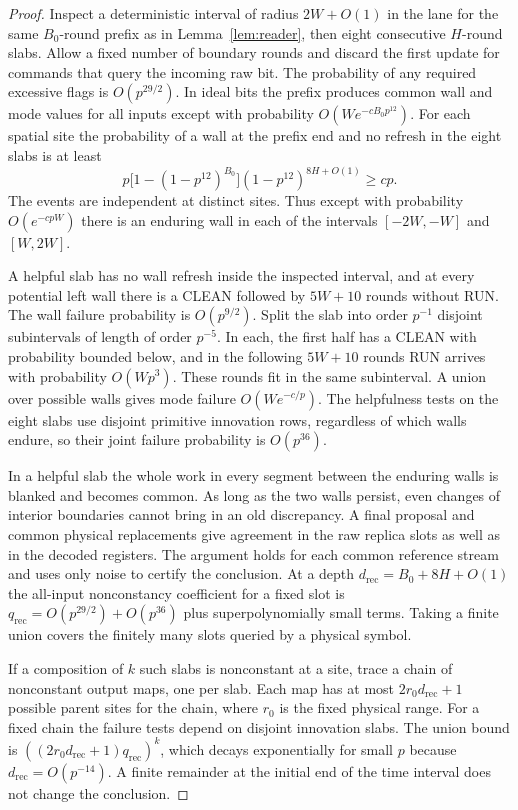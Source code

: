 \begin{proof}
Inspect a deterministic interval of radius \(2W+O(1)\) in the lane for the same \(B_0\)-round prefix as in Lemma~\ref{lem:reader}, then eight consecutive \(H\)-round slabs. Allow a fixed number of boundary rounds and discard the first update for commands that query the incoming raw bit. The probability of any required excessive flags is \(O(p^{29/2})\). In ideal bits the prefix produces common wall and mode values for all inputs except with probability \(O(W e^{-cB_0p^{12}})\). For each spatial site the probability of a wall at the prefix end and no refresh in the eight slabs is at least
\[
p\bigl[1-(1-p^{12})^{B_0}\bigr](1-p^{12})^{8H+O(1)}\ge cp.
\]
The events are independent at distinct sites. Thus except with probability \(O(e^{-cpW})\) there is an enduring wall in each of the intervals \([-2W,-W]\) and \([W,2W]\).

A helpful slab has no wall refresh inside the inspected interval, and at every potential left wall there is a CLEAN followed by \(5W+10\) rounds without RUN. The wall failure probability is \(O(p^{9/2})\). Split the slab into order \(p^{-1}\) disjoint subintervals of length of order \(p^{-5}\). In each, the first half has a CLEAN with probability bounded below, and in the following \(5W+10\) rounds RUN arrives with probability \(O(Wp^3)\). These rounds fit in the same subinterval. A union over possible walls gives mode failure \(O(W e^{-c/p})\). The helpfulness tests on the eight slabs use disjoint primitive innovation rows, regardless of which walls endure, so their joint failure probability is \(O(p^{36})\).

In a helpful slab the whole work in every segment between the enduring walls is blanked and becomes common. As long as the two walls persist, even changes of interior boundaries cannot bring in an old discrepancy. A final proposal and common physical replacements give agreement in the raw replica slots as well as in the decoded registers. The argument holds for each common reference stream and uses only noise to certify the conclusion. At a depth \(d_{\mathrm{rec}}=B_0+8H+O(1)\) the all-input nonconstancy coefficient for a fixed slot is \(q_{\mathrm{rec}}=O(p^{29/2})+O(p^{36})\) plus superpolynomially small terms. Taking a finite union covers the finitely many slots queried by a physical symbol.

If a composition of \(k\) such slabs is nonconstant at a site, trace a chain of nonconstant output maps, one per slab. Each map has at most \(2r_0d_{\mathrm{rec}}+1\) possible parent sites for the chain, where \(r_0\) is the fixed physical range. For a fixed chain the failure tests depend on disjoint innovation slabs. The union bound is \(((2r_0d_{\mathrm{rec}}+1)q_{\mathrm{rec}})^k\), which decays exponentially for small \(p\) because \(d_{\mathrm{rec}}=O(p^{-14})\). A finite remainder at the initial end of the time interval does not change the conclusion.
\end{proof}
